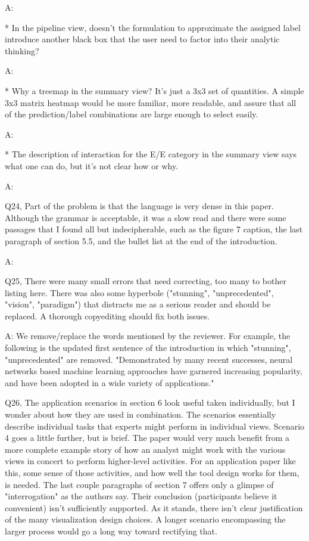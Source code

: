 A:

* In the pipeline view, doesn't the formulation to approximate the assigned label introduce another black box that the user need to factor into their analytic thinking?

A:

* Why a treemap in the summary view? It's just a 3x3 set of quantities. A simple 3x3 matrix heatmap would be more familiar, more readable, and assure that all of the prediction/label combinations are large enough to select easily.

A:

* The description of interaction for the E/E category in the summary view says what one can do, but it's not clear how or why.

A:

Q24, Part of the problem is that the language is very dense in this paper. Although the grammar is acceptable, it was a slow read and there were some passages that I found all but indecipherable, such as the figure 7 caption, the last paragraph of section 5.5, and the bullet list at the end of the introduction.

A:

Q25, There were many small errors that need correcting, too many to bother listing here. There was also some hyperbole ("stunning", "unprecedented", "vision", "paradigm") that distracts me as a serious reader and should be replaced. A thorough copyediting should fix both issues.

A: We remove/replace the words mentioned by the reviewer. For example, the following is the updated first sentence of the introduction in which "stunning", "unprecedented" are removed. "Demonstrated by many recent successes, neural networks based machine learning approaches have garnered increasing popularity, and have been adopted in a wide variety of applications."


Q26, The application scenarios in section 6 look useful taken individually, but I wonder about how they are used in combination. The scenarios essentially describe individual tasks that experts might perform in individual views. Scenario 4 goes a little further, but is brief. The paper would very much benefit from a more complete example story of how an analyst might work with the various views in concert to perform higher-level activities. For an application paper like this, some sense of those activities, and how well the tool design works for them, is needed. The last couple paragraphs of section 7 offers only a glimpse of "interrogation" as the authors say.
Their conclusion (participants believe it convenient) isn't sufficiently supported. As it stands, there isn't clear justification of the many visualization design choices. A longer scenario encompassing the larger process would go a long way toward rectifying that.

